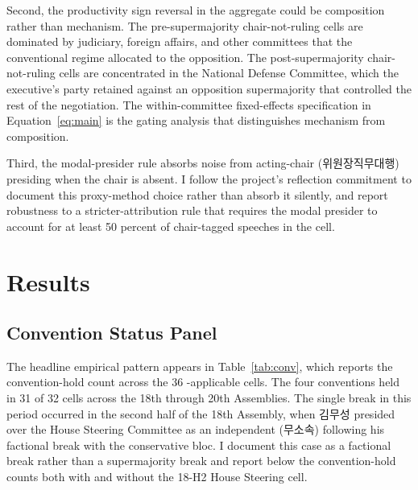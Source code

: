 \documentclass[11pt]{article}
\begin{document}
Second, the productivity sign reversal in the aggregate could be composition rather than mechanism. The pre-supermajority chair-not-ruling cells are dominated by judiciary, foreign affairs, and other committees that the conventional regime allocated to the opposition. The post-supermajority chair-not-ruling cells are concentrated in the National Defense Committee, which the executive's party retained against an opposition supermajority that controlled the rest of the negotiation. The within-committee fixed-effects specification in Equation~\ref{eq:main} is the gating analysis that distinguishes mechanism from composition.

Third, the modal-presider rule absorbs noise from acting-chair (위원장직무대행) presiding when the chair is absent. I follow the project's reflection commitment to document this proxy-method choice rather than absorb it silently, and report robustness to a stricter-attribution rule that requires the modal presider to account for at least 50 percent of chair-tagged speeches in the cell.

\section{Results}

\subsection{Convention Status Panel}

The headline empirical pattern appears in Table~\ref{tab:conv}, which reports the convention-hold count across the 36 \citet{jung2018}-applicable cells. The four conventions held in 31 of 32 cells across the 18th through 20th Assemblies. The single break in this period occurred in the second half of the 18th Assembly, when 김무성 presided over the House Steering Committee as an independent (무소속) following his factional break with the conservative bloc. I document this case as a factional break rather than a supermajority break and report below the convention-hold counts both with and without the 18-H2 House Steering cell.
\end{document}
